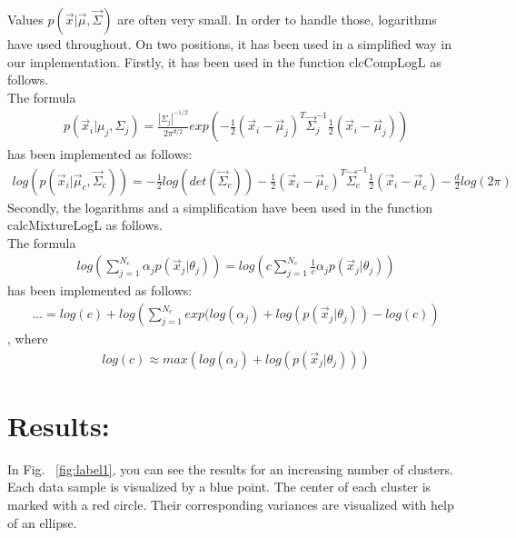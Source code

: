 \documentclass[a4paper,headings=small]{scrartcl}
\numberwithin{equation}{section} %
\numberwithin{figure}{section}   %
\begin{document}
Values $p( \vec x | \vec \mu, \vec \Sigma)$ are often very small.
In order to handle those, logarithms have used throughout.
On two positions, it has been used in a simplified way in our implementation.
Firstly, it has been used in the function clcCompLogL 
as follows.\\
The formula
\begin{align}
p( \vec x_i | \mu_j, \Sigma_j) =
    \frac{|\Sigma_j|^{-1/2}}{2 \pi^{d/2}}
    exp  \left( 
                     - \frac{1}{2} ( \vec x_i - \vec \mu_j )^T
                       \vec \Sigma_j^{-1}
                       \frac{1}{2} ( \vec x_i - \vec \mu_j )
    \right)
\end{align}
has been implemented as follows:
\begin{align}
log \left( p( \vec x_i | \vec \mu_c, \vec \Sigma_c) \right) =
                     - \frac{1}{2} log \left( det(\vec \Sigma_c) \right)
                     - \frac{1}{2} ( \vec x_i - \vec \mu_c )^T
                       \vec \Sigma_c^{-1}
                       \frac{1}{2} ( \vec x_i - \vec \mu_c )
                     - \frac{d}{2} log(2 \pi)
\end{align}
Secondly, the logarithms and a simplification have been used in the function calcMixtureLogL
as follows.\\
The formula
\begin{align}
log \left( \sum\nolimits_{j=1}^{N_c} \alpha_j p( \vec x_j | \theta_j )  \right) = 
      log \left( c \sum\nolimits_{j=1}^{N_c} \frac{1}{c} \alpha_j p( \vec x_j | \theta_j ) \right)
\end{align}
has been implemented as follows:
\begin{align}
... = log \left( c \right)
      + log \left(\sum\nolimits_{j=1}^{N_c} exp( log (\alpha_j)
         + log \left( p( \vec x_j | \theta_j ) \right) 
         - log \left( c \right) \right)
\end{align}
, where
\begin{align}
log(c) \approx max \left( log(\alpha_j) + log \left( p( \vec x_j | \theta_j ) \right) \right)
\end{align}
\section{Results:}

In Fig. ~\ref{fig:label1}, you can see the results for an increasing number of clusters.
Each data sample is visualized by a blue point. 
The center of each cluster is marked with a red circle.
Their corresponding variances are visualized with help of an ellipse.
\end{document}
